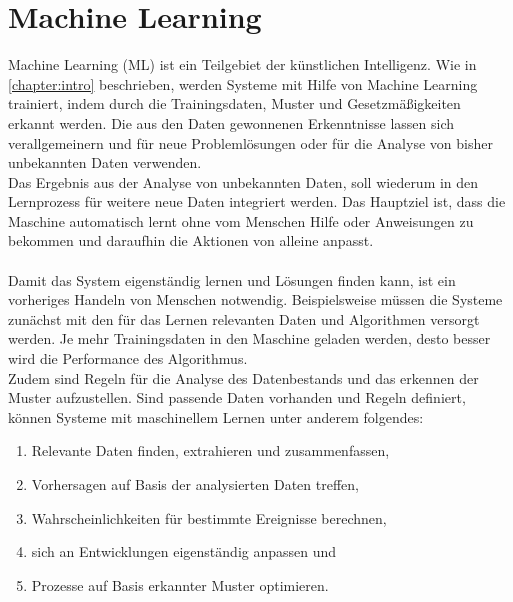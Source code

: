 \documentclass[12pt,oneside,a4paper,parskip]{scrbook}
\begin{document}
\section{Machine Learning}
Machine Learning (ML) ist ein Teilgebiet der künstlichen Intelligenz. Wie in \ref{chapter:intro} beschrieben, werden Systeme mit Hilfe von Machine Learning trainiert, indem durch die Trainingsdaten, Muster und Gesetzmäßigkeiten erkannt werden. Die aus den Daten gewonnenen Erkenntnisse lassen sich verallgemeinern und für neue Problemlösungen oder für die Analyse von bisher unbekannten Daten verwenden.\\
Das Ergebnis aus der Analyse von unbekannten Daten, soll wiederum in den Lernprozess für weitere neue Daten integriert werden. Das Hauptziel ist, dass die Maschine automatisch lernt ohne vom Menschen Hilfe oder Anweisungen zu bekommen und daraufhin die Aktionen von alleine anpasst\cite{EliminateHumanBias}.
\\\\
Damit das System eigenständig lernen und Lösungen finden kann, ist ein vorheriges Handeln von Menschen notwendig. Beispielsweise müssen die Systeme zunächst mit den für das Lernen relevanten Daten und Algorithmen versorgt werden.
Je mehr Trainingsdaten in den Maschine geladen werden, desto besser wird die Performance des Algorithmus.\\
Zudem sind Regeln für die Analyse des Datenbestands und das erkennen der Muster aufzustellen. Sind passende Daten vorhanden und Regeln definiert, können Systeme mit maschinellem Lernen unter anderem folgendes:

\begin{enumerate}
	\item Relevante Daten finden, extrahieren und zusammenfassen,
	\item Vorhersagen auf Basis der analysierten Daten treffen,
	\item Wahrscheinlichkeiten für bestimmte Ereignisse berechnen,
	\item sich an Entwicklungen eigenständig anpassen und
	\item Prozesse auf Basis erkannter Muster optimieren.
\end{enumerate}
\end{document}
